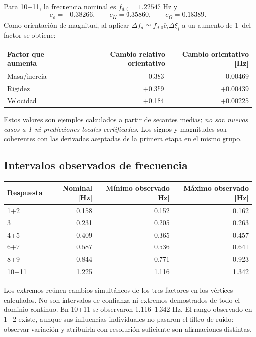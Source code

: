 \documentclass[11pt,a4paper]{article}
\newcommand{\pct}{\text{\char37}}
\begin{document}
Para 10+11, la frecuencia nominal es $f_{d,0}=1.22543$ Hz y
\begin{equation}
\overline c_\rho=-0.38266,\qquad
\overline c_K=0.35860,\qquad
\overline c_\Omega=0.18389.
\end{equation}
Como orientación de magnitud, al aplicar $\Delta f_d\simeq f_{d,0}\overline c_i\Delta\xi_i$ a un aumento de 1\pct\ del factor se obtiene:
\begin{center}\small
\begin{tabular}{lrr}
\toprule Factor que aumenta & Cambio relativo orientativo & Cambio orientativo [Hz] \\ \midrule
Masa/inercia & -0.383\,\pct & -0.00469 \\
Rigidez & +0.359\,\pct & +0.00439 \\
Velocidad & +0.184\,\pct & +0.00225 \\

\bottomrule
\end{tabular}
\end{center}
Estos valores son ejemplos calculados a partir de secantes medias; \emph{no son nuevos casos a 1\pct\ ni predicciones locales certificadas}. Los signos y magnitudes son coherentes con las derivadas aceptadas de la primera etapa en el mismo grupo.

\subsection{Intervalos observados de frecuencia}
\begin{center}\small
\begin{tabular}{lrrr}
\toprule Respuesta & Nominal [Hz] & Mínimo observado [Hz] & Máximo observado [Hz] \\ \midrule
1+2 & 0.158 & 0.152 & 0.162 \\
3 & 0.231 & 0.205 & 0.263 \\
4+5 & 0.409 & 0.365 & 0.457 \\
6+7 & 0.587 & 0.536 & 0.641 \\
8+9 & 0.844 & 0.771 & 0.923 \\
10+11 & 1.225 & 1.116 & 1.342 \\

\bottomrule
\end{tabular}
\end{center}
Los extremos reúnen cambios simultáneos de los tres factores en los vértices calculados. No son intervalos de confianza ni extremos demostrados de todo el dominio continuo. En 10+11 se observaron 1.116--1.342 Hz. El rango observado en 1+2 existe, aunque sus influencias individuales no pasaron el filtro de ruido: observar variación y atribuirla con resolución suficiente son afirmaciones distintas.
\end{document}
